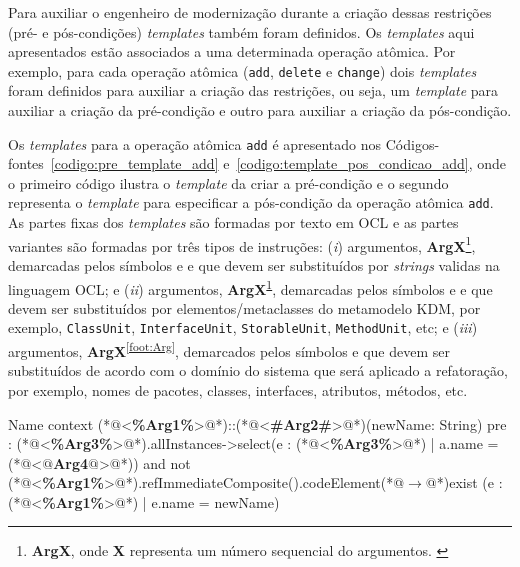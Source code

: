 Para auxiliar o engenheiro de modernização durante a criação dessas restrições (pré- e pós-condições) \textit{templates} também foram definidos. Os \textit{templates} aqui apresentados estão associados a uma determinada operação atômica. Por exemplo, para cada operação atômica (\texttt{add}, \texttt{delete} e \texttt{change}) dois \textit{templates} foram definidos para auxiliar a criação das restrições, ou seja, um \textit{template} para auxiliar a criação da pré-condição e outro para auxiliar a criação da pós-condição.

Os \textit{templates} para a operação atômica \texttt{add} é apresentado nos Códigos-fontes~\ref{codigo:pre_template_add} e~\ref{codigo:template_pos_condicao_add}, onde o primeiro código ilustra o \textit{template} da criar a pré-condição e o segundo representa o \textit{template} para especificar a pós-condição da operação atômica \texttt{add}. As partes fixas dos \textit{templates} são formadas por texto em OCL e as partes variantes são formadas por três tipos de instruções: (\textit{i}) argumentos, \textbf{ArgX}\footnote{\textbf{ArgX}, onde \textbf{X} representa um número sequencial do argumentos. \label{foot:Arg1}}, demarcadas pelos símbolos \aspas{\textbf{<\#}} e \aspas{\textbf{\#>}} e que devem ser substituídos por \textit{strings} validas na linguagem OCL; e (\textit{ii}) argumentos, \textbf{ArgX}\textsuperscript{\ref{foot:Arg1}}, demarcadas pelos símbolos \aspas{\textbf{<\%}} e \aspas{\textbf{\%>}} e que devem ser substituídos por elementos/metaclasses do metamodelo KDM, por exemplo, \texttt{ClassUnit}, \texttt{InterfaceUnit}, \texttt{StorableUnit}, \texttt{MethodUnit}, etc; e (\textit{iii}) argumentos, \textbf{ArgX}\textsuperscript{\ref{foot:Arg}}, demarcados pelos símbolos  e  que devem ser substituídos de acordo com o domínio do sistema que será aplicado a refatoração, por exemplo, nomes de pacotes, classes, interfaces, atributos, métodos, etc.  

\begin{codigo}[caption={[\textit{Template} OCL para realizar a pré-condição da operação atômica \texttt{add}.] \textit{Template} OCL para realizar a pré-condição da operação atômica \texttt{add}.},escapeinside={(*@}{@*)}, basicstyle=\footnotesize, label={codigo:pre_template_add}, language=OCL]{Name}
context (*@<\textbf{\%Arg1\%}>@*)::(*@<\textbf{\#Arg2\#}>@*)(newName: String)
pre : (*@<\textbf{\%Arg3\%}>@*).allInstances->select(e : (*@<\textbf{\%Arg3\%}>@*) | a.name = (*@<\textbf{$@$Arg4$@$}>@*)) and not (*@<\textbf{\%Arg1\%}>@*).refImmediateComposite().codeElement(*@$\rightarrow$@*)exist (e : (*@<\textbf{\%Arg1\%}>@*) | e.name = newName)
\end{codigo}

